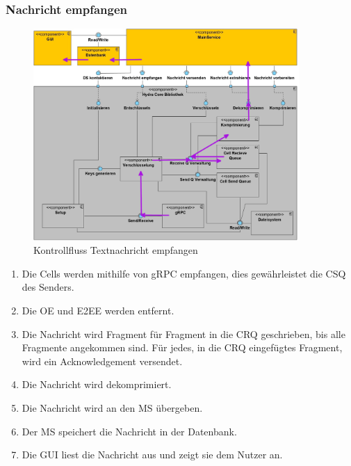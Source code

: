 \newpage
\subsubsection{Nachricht empfangen}

\begin{figure}[h]
  \centering
     \includegraphics[width=0.9\textwidth]{diagramme/Glob_Kontrollfluss_2.jpg}
  \caption{Kontrollfluss Textnachricht empfangen}
  \label{fig:Bild6}
\end{figure}

\begin{enumerate}
    \item
        Die Cells werden mithilfe von \ac{gRPC} empfangen, dies gewährleistet die \ac{CSQ} des Senders.

    \item
        Die \ac{OE} und \ac{E2EE} werden entfernt.

    \item
        Die Nachricht wird Fragment für Fragment in die \ac{CRQ} geschrieben, bis alle Fragmente angekommen sind. Für jedes, in die \ac{CRQ} eingefügtes Fragment, wird ein Acknowledgement versendet.

    \item
        Die Nachricht wird dekomprimiert.

    \item
        Die Nachricht wird an den \ac{MS} übergeben.

    \item
        Der \ac{MS} speichert die Nachricht in der Datenbank.

    \item
        Die \ac{GUI} liest die Nachricht aus und zeigt sie dem Nutzer an.
\end{enumerate}

